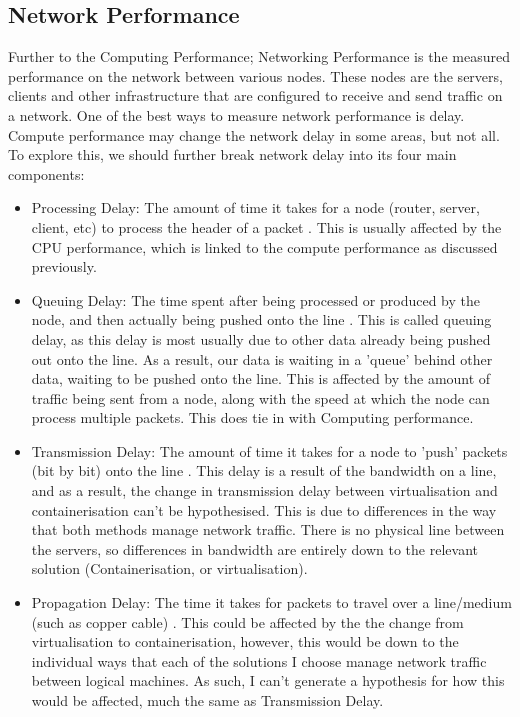 \subsection{Network Performance}
Further to the Computing Performance; Networking Performance is the measured performance on the network between various nodes. These nodes are the servers, clients and other infrastructure that are configured to receive and send traffic on a network. One of the best ways to measure network performance is delay. Compute performance may change the network delay in some areas, but not all. To explore this, we should further break network delay into its four main components:
\begin{itemize}
  \item Processing Delay: The amount of time it takes for a node (router, server, client, etc) to process the header of a packet \citep{ProcessingDelay}. This is usually affected by the CPU performance, which is linked to the compute performance as discussed previously.
  \item Queuing Delay: The time spent after being processed or produced by the node, and then actually being pushed onto the line \citep{QueuingDelay}. This is called queuing delay, as this delay is most usually due to other data already being pushed out onto the line. As a result, our data is waiting in a 'queue' behind other data, waiting to be pushed onto the line. This is affected by the amount of traffic being sent from a node, along with the speed at which the node can process multiple packets. This does tie in with Computing performance.
  \item Transmission Delay: The amount of time it takes for a node to 'push' packets (bit by bit) onto the line \citep[Chapter 7]{chen2005}. This delay is a result of the bandwidth on a line, and as a result, the change in transmission delay between virtualisation and containerisation can't be hypothesised. This is due to differences in the way that both methods manage network traffic. There is no physical line between the servers, so differences in bandwidth are entirely down to the relevant solution (Containerisation, or virtualisation).
  \item Propagation Delay: The time it takes for packets to travel over a line/medium (such as copper cable) \citep{PropogationDelay}. This could be affected by the the change from virtualisation to containerisation, however, this would be down to the individual ways that each of the solutions I choose manage network traffic between logical machines. As such, I can't generate a hypothesis for how this would be affected, much the same as Transmission Delay.


\end{itemize}
